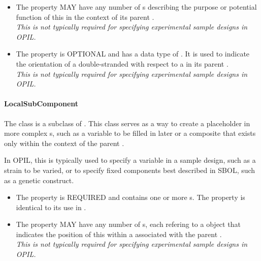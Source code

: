 \begin{itemize}
\item \label{sec:sbol:role:F}
The  property MAY have any number of s describing the purpose or potential function of this  in the context of its parent .
\\{\em This is not typically required for specifying experimental sample designs in OPIL.}

\item \label{sec:sbol:orientation:F}
The  property is OPTIONAL and has a data type of . It is used to indicate the orientation of a double-stranded  with respect to a  in its parent .
\\{\em This is not typically required for specifying experimental sample designs in OPIL.}
\end{itemize}

\paragraph{LocalSubComponent}
\label{sec:sbol:LocalSubComponent}

The  class is a subclass of . 
This class serves as a way to create a placeholder in more complex s, such as a variable to be filled in later or a composite that exists only within the context of the parent .

In OPIL, this is typically used to specify a variable in a sample design, such as a strain to be varied, or to specify fixed components best described in SBOL, such as a genetic construct.

\begin{itemize}
\item \label{sec:sbol:type:LSC}
The  property is REQUIRED and contains one or more s. The  property is identical to its use in .

\item \label{sec:sbol:hasLocation:LSC}
The  property MAY have any number of s, each refering to a  object that indicates the position of this  within a  associated with the parent .
\\{\em This is not typically required for specifying experimental sample designs in OPIL.}
\end{itemize}

